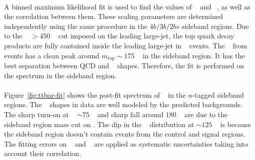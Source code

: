 \paragraph{}
A binned maximum likelihood fit is used to find the values of \muqcd~ and \alphatt~, as well as the correlation between them.
These scaling parameters are determined independently using the same procedure in the $4b/3b/2bs$ sideband regions.
Due to the \pt~ $>450$ \GeV~ cut imposed on the leading large-\R jet, the top quark decay products are fully contained inside the leading large-\R jet in \ttbar~ events. 
The \mleadJ~ from \ttbar~ events has a clean peak around $m_{top} \sim 175$ \GeV~ in the sideband region.
It has the best separation between QCD and \ttbar~ shapes.
Therefore, the fit is performed on the \mleadJ spectrum in the sideband region.

\paragraph{}
Figure~\ref{fig:ttbar-fit} shows the post-fit spectrum of \mleadJ~ in the $n$-tagged sideband regions.
The \mleadJ~ shapes in data are well modeled by the predicted backgrounds.
The sharp turn-on at \mleadJ~ $\sim 75$ \GeV~ and sharp fall around $180$ \GeV~ are due to the sideband region mass cut on \mleadJ.
The dip in the \mleadJ~ distribution at $\sim 125$ \GeV~ is because the sideband region doesn't contain events from the control and signal regions.
The fitting errors on \muqcd~ and \alphatt~ are applied as systematic uncertainties taking into account their correlation.

